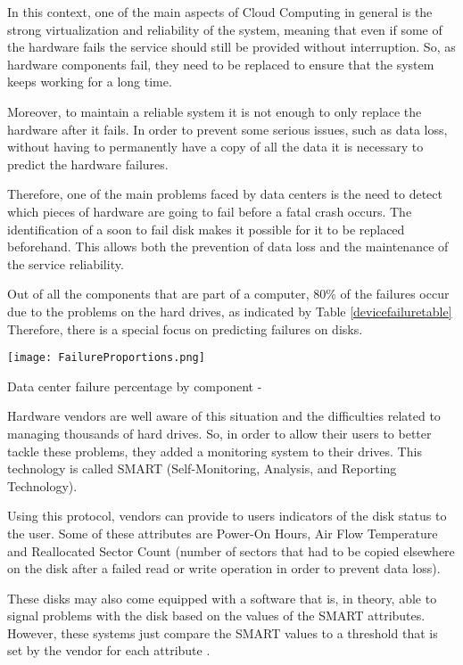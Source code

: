 In this context, one of the main aspects of Cloud Computing in general is the strong virtualization and reliability of the system\cite{Qian09}, meaning that even if some of the hardware fails the service should still be provided without interruption.
So, as hardware components fail, they need to be replaced to ensure that the system keeps working for a long time.

Moreover, to maintain a reliable system it is not enough to only replace the hardware after it fails.
In order to prevent some serious issues, such as data loss, without having to permanently have a copy of all the data it is necessary to predict the hardware failures.

Therefore, one of the main problems faced by data centers is the need to detect which pieces of hardware are going to fail before a fatal crash occurs.
The identification of a soon to fail disk makes it possible for it to be replaced beforehand.
This allows both the prevention of data loss and the maintenance of the service reliability.

Out of all the components that are part of a computer, $80\%$ of the failures occur due to the problems on the hard drives, as indicated by Table \ref{devicefailuretable}
Therefore, there is a special focus on predicting failures on disks.

\begin{table}
    \begin{center}
      \texttt{[image: FailureProportions.png]}
      \caption[Failure percentage by component]{Data center failure percentage by component - \cite{Wang17}}
      \label{devicefailuretable}
    \end{center}
  \end{table}

Hardware vendors are well aware of this situation and the difficulties related to managing thousands of hard drives.
So, in order to allow their users to better tackle these problems, they added a monitoring system to their drives.
This technology is called SMART (Self-Monitoring, Analysis, and Reporting Technology).

Using this protocol, vendors can provide to users indicators of the disk status to the user.
Some of these attributes are Power-On Hours, Air Flow Temperature and Reallocated Sector Count (number of sectors that had to be copied elsewhere on the disk after a failed read or write operation in order to prevent data loss)\cite{SamsungSSD}.

These disks may also come equipped with a software that is, in theory, able to signal problems with the disk based on the values of the SMART attributes.
However, these systems just compare the SMART values to a threshold that is set by the vendor for each attribute \cite{SamsungSSD}.

